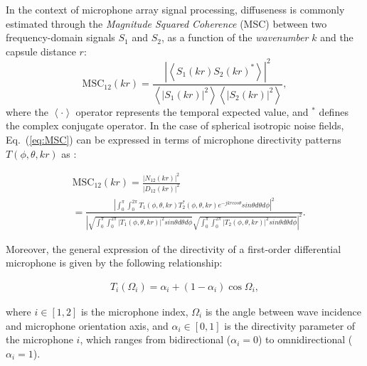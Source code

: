 In the context of microphone array signal processing, diffuseness is commonly estimated through the
\textit{Magnitude Squared Coherence} (MSC) \cite{elko_spatial_2001} between two frequency-domain signals $S_1$ and $S_2$, as a function of the
\textit{wavenumber} $k$ and the capsule distance $r$:
\begin{equation}
    \text{MSC}_{12}(k r) =
	\frac{|\left\langle S_1(k r) S_2(k r)^* \right\rangle|^2}
	{\left\langle|S_1(k r)|^2\right\rangle \left\langle|S_2(k r)|^2\right\rangle},
    \label{eq:MSC}
\end{equation}
where the $\left\langle \cdot \right\rangle$ operator represents the temporal
expected value, and $^*$ defines the complex conjugate operator. In the case of spherical isotropic noise fields, Eq.~(\ref{eq:MSC})
can be expressed in terms of microphone directivity patterns
$T(\phi,\theta,k r)$ as \cite{elko_spatial_2001}:

\begin{equation}
	\begin{aligned}
&\text{MSC}_{12}(k r) = \frac{|N_{12}(k r)|^2}{|D_{12}(kr)|^2} \\
&= \frac{|\int_{0}^{\pi} \int_{0}^{2\pi} T_1(\phi,\theta,k r) T_2^*(\phi,\theta,k r) e^{-jk r cos\theta} sin\theta d\theta d\phi|^2}{|\sqrt{ \int_{0}^{\pi} \int_{0}^{2\pi} |T_1(\phi,\theta,k r)|^2 sin\theta d\theta d\phi } \sqrt{\int_{0}^{\pi} \int_{0}^{2\pi}|T_2(\phi,\theta,k r)|^2 sin\theta d\theta d\phi}|^2}.
\label{eq:MSCdir}
    \end{aligned}
\end{equation}


Moreover, the general expression of the directivity of a first-order differential microphone is given by the following relationship:

\begin{equation}
	\begin{aligned}
	T_i(\Omega_i) = \alpha_i + (1 - \alpha_i) \cos{\Omega_i},
	\end{aligned}
\end{equation}


where $i \in [1,2]$ is the microphone index, $\Omega_i$ is the angle between wave incidence and microphone orientation axis, and $\alpha_i \in [0,1]$ is the directivity parameter of the microphone $i$, which ranges from bidirectional ($\alpha_i = 0$) to omnidirectional ($\alpha_i = 1$). \\


